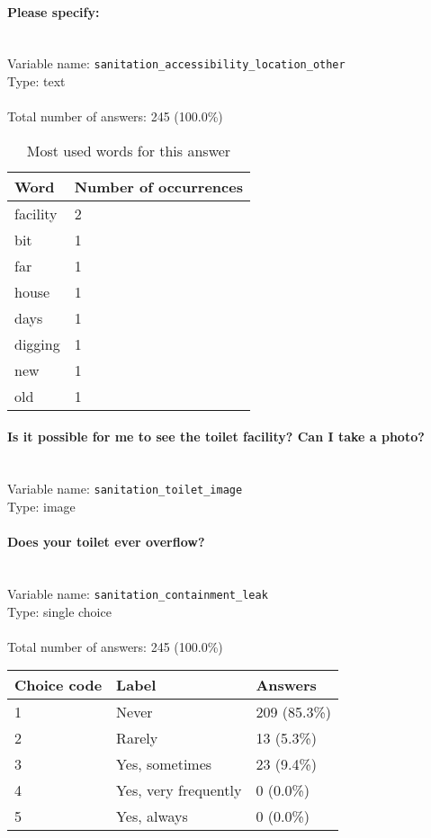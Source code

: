 \documentclass[11.5pt, a4paper]{scrartcl}
\begin{document}
\paragraph{Please specify:}
\  \\Variable name: \texttt{sanitation\_accessibility\_location\_other}\\
Type: text\\
\\Total number of answers: 245 (100.0\%)
\\[0.2em]\begin{table}[H]
 \begin{tabular}{p{4cm}|p{8cm}}
Word & Number of occurrences  \\
\hline
\cellcolor{mygray}facility&\cellcolor{mygray}2\\
\hline
bit&1\\
\hline
\cellcolor{mygray}far&\cellcolor{mygray}1\\
\hline
house&1\\
\hline
\cellcolor{mygray}days&\cellcolor{mygray}1\\
\hline
digging&1\\
\hline
\cellcolor{mygray}new&\cellcolor{mygray}1\\
\hline
old&1\\
\hline
\end{tabular}
\caption{\label{tab:table-name} Most used words for this answer}
\end{table}
\paragraph{Is it possible for me to see the toilet facility? Can I take a photo?}
\  \\Variable name: \texttt{sanitation\_toilet\_image}\\
Type: image\\
\paragraph{Does your toilet ever overflow? }
\  \\Variable name: \texttt{sanitation\_containment\_leak}\\
Type: single choice\\
\\Total number of answers: 245 (100.0\%)
\\[0.2em] \begin{tabular}{p{4cm}|p{8cm}|p{3cm}}
Choice code & Label & Answers \\
\hline
1 & Never& \cellcolor{color4}209 (85.3\%)\\
\cellcolor{mygray} 2 & \cellcolor{mygray}Rarely & \cellcolor{color0}13 (5.3\%)\\
3 & Yes, sometimes& \cellcolor{color0}23 (9.4\%)\\
\cellcolor{mygray} 4 & \cellcolor{mygray}Yes, very frequently & \cellcolor{color0}0 (0.0\%)\\
5 & Yes, always& \cellcolor{color0}0 (0.0\%)\\
\end{tabular}
\end{document}
